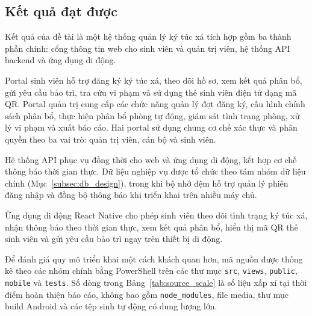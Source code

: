\documentclass[../DoAn.tex]{subfiles}
\begin{document}
\subsection{Kết quả đạt được}
\label{subsec:results}

Kết quả của đề tài là một hệ thống quản lý ký túc xá tích hợp gồm ba thành phần chính: cổng thông tin web cho sinh viên và quản trị viên, hệ thống API backend và ứng dụng di động.

Portal sinh viên hỗ trợ đăng ký ký túc xá, theo dõi hồ sơ, xem kết quả phân bổ, gửi yêu cầu bảo trì, tra cứu vi phạm và sử dụng thẻ sinh viên điện tử dạng mã QR. Portal quản trị cung cấp các chức năng quản lý đợt đăng ký, cấu hình chính sách phân bổ, thực hiện phân bổ phòng tự động, giám sát tình trạng phòng, xử lý vi phạm và xuất báo cáo. Hai portal sử dụng chung cơ chế xác thực và phân quyền theo ba vai trò: quản trị viên, cán bộ và sinh viên.

Hệ thống API phục vụ đồng thời cho web và ứng dụng di động, kết hợp cơ chế thông báo thời gian thực. Dữ liệu nghiệp vụ được tổ chức theo tám nhóm dữ liệu chính (Mục~\ref{subsec:db_design}), trong khi bộ nhớ đệm hỗ trợ quản lý phiên đăng nhập và đồng bộ thông báo khi triển khai trên nhiều máy chủ.

Ứng dụng di động React Native cho phép sinh viên theo dõi tình trạng ký túc xá, nhận thông báo theo thời gian thực, xem kết quả phân bổ, hiển thị mã QR thẻ sinh viên và gửi yêu cầu bảo trì ngay trên thiết bị di động.

Để đánh giá quy mô triển khai một cách khách quan hơn, mã nguồn được thống kê
theo các nhóm chính bằng PowerShell trên các thư mục \texttt{src},
\texttt{views}, \texttt{public}, \texttt{mobile} và \texttt{tests}. Số dòng
trong Bảng~\ref{tab:source_scale} là số liệu xấp xỉ tại thời điểm hoàn thiện
báo cáo, không bao gồm \texttt{node\_modules}, file media, thư mục build Android
và các tệp sinh tự động có dung lượng lớn.
\end{document}
